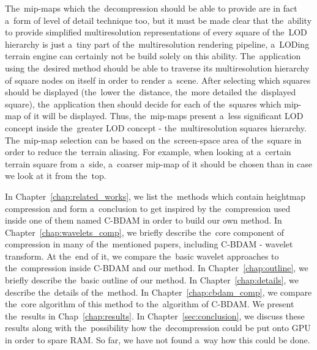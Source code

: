  The~mip-maps which the~decompression should be able to provide are in fact a~form of level of detail technique too, but it must be made clear that the~ability to provide simplified multiresolution representations of every square of the~LOD hierarchy is just a~tiny part of the~multiresolution rendering pipeline, a~LODing terrain engine can certainly not be build solely on this ability. The~application using the~desired method should be able to traverse its multiresolution hierarchy of square nodes on itself in order to render a~scene. After selecting which squares should be displayed (the~lower the~distance, the~more detailed the~displayed square), the~application then should decide for each of the~squares which mip-map of it will be displayed. Thus, the~mip-maps present a~less significant LOD concept inside the~greater LOD concept - the~multiresolution squares hierarchy. The~mip-map selection can be based on the~screen-space area of the~square in order to reduce the~terrain aliasing. For example, when looking at a~certain terrain square from a~side, a~coarser mip-map of it should be chosen than in case we look at it from the~top.

In Chapter~\ref{chap:related_works}, we list the~methods which contain heightmap compression and form a~conclusion to get inspired by the~compression used inside one of them named C-BDAM in order to build our own method. In Chapter~\ref{chap:wavelets_comp}, we briefly describe the~core component of compression in many of the~mentioned papers, including C-BDAM - wavelet transform. At the~end of it, we compare the~basic wavelet approaches to the~compression inside C-BDAM and our method. In Chapter~\ref{chap:outline}, we briefly describe the~basic outline of our method. In Chapter~\ref{chap:details}, we describe the~details of the~method. In Chapter~\ref{chap:cbdam_comp}, we compare the~core algorithm of this method to the~algorithm of C-BDAM. We present the~results in Chap~\ref{chap:results}. In Chapter~\ref{sec:conclusion}, we discuss these results along with the~possibility how the~decompression could be put onto GPU in order to spare RAM. So far, we have not found a~way how this could be done.